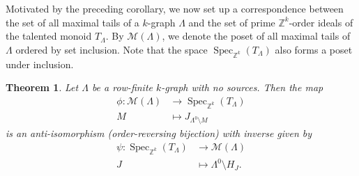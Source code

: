 \documentclass[a4paper,reqno,12pt]{amsart}
\numberwithin{equation}{section}
\newtheorem{thm}{Theorem}[section]
\theoremstyle{definition}
\theoremstyle{remark}
\newcommand{\Spec}{\operatorname{Spec}}
\begin{document}
Motivated by the preceding corollary, we now set up a correspondence between the set of all maximal tails of a $k$-graph $\Lambda$ and the set of prime $\mathbb{Z}^k$-order ideals of the talented monoid $T_\Lambda$. By $\mathscr{M}(\Lambda)$, we denote the poset of all maximal tails of $\Lambda$ ordered by set inclusion. Note that the space $\Spec_{\mathbb{Z}^k}(T_\Lambda)$ also forms a poset under inclusion.
\begin{thm}\label{th maximal tails via TM}
Let $\Lambda$ be a row-finite $k$-graph with no sources. Then the map
\begin{align*}
\phi:\mathscr{M}(\Lambda) & \longrightarrow  \Spec_{\mathbb{Z}^k}(T_\Lambda)\\
M &\longmapsto J_{\Lambda^0\setminus M}
\end{align*}
is an anti-isomorphism (order-reversing bijection) with inverse given by 
\begin{align*}
\psi:\Spec_{\mathbb{Z}^k}(T_\Lambda) &\longrightarrow \mathscr{M}(\Lambda)\\
J &\longmapsto \Lambda^0\setminus H_J.
\end{align*}    
\end{thm}
\end{document}
